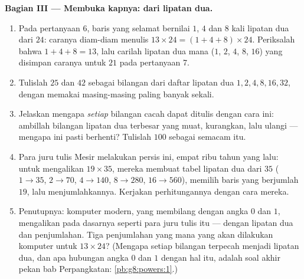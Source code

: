 \begin{problem}
\medskip
\noindent\textbf{Bagian III --- Membuka kapnya:  dari
lipatan dua.}
\begin{enumerate}[resume]
  \item Pada pertanyaan 6, baris yang selamat bernilai $1$, $4$
        dan $8$ kali lipatan dua dari $24$: caranya diam-diam menulis
        $13 \times 24 = (1 + 4 + 8) \times 24$. Periksalah bahwa
        $1 + 4 + 8 = 13$, lalu carilah lipatan dua mana ($1$, $2$,
        $4$, $8$, $16$) yang disimpan caranya untuk $21$ pada
        pertanyaan 7.
  \item Tulislah $25$ dan $42$ sebagai  bilangan dari daftar
        lipatan dua $1, 2, 4, 8, 16, 32$, dengan memakai masing-masing
        paling banyak sekali.
  \item Jelaskan mengapa \emph{setiap} bilangan cacah dapat ditulis
        dengan cara ini: ambillah bilangan lipatan dua terbesar yang
        muat, kurangkan, lalu ulangi --- mengapa ini pasti berhenti?
        Tulislah $100$ sebagai  semacam itu.
  \item Para juru tulis Mesir melakukan persis ini, empat ribu tahun
        yang lalu: untuk mengalikan $19 \times 35$, mereka membuat
        tabel lipatan dua dari $35$ ($1 \to 35$, $2 \to 70$,
        $4 \to 140$, $8 \to 280$, $16 \to 560$), memilih baris yang
        berjumlah $19$, lalu menjumlahkannya. Kerjakan perhitungannya
        dengan cara mereka.
  \item Penutupnya: komputer modern, yang membilang dengan angka $0$
        dan $1$, mengalikan pada dasarnya seperti para juru tulis itu
        --- dengan lipatan dua dan penjumlahan. Tiga penjumlahan yang
        mana yang akan dilakukan komputer untuk $13 \times 24$?
        (Mengapa setiap bilangan terpecah menjadi lipatan dua, dan apa
        hubungan angka $0$ dan $1$ dengan hal itu, adalah soal akhir
        pekan bab Perpangkatan: \cref{pb:g8:powers:1}.)

\end{enumerate}
\end{problem}
